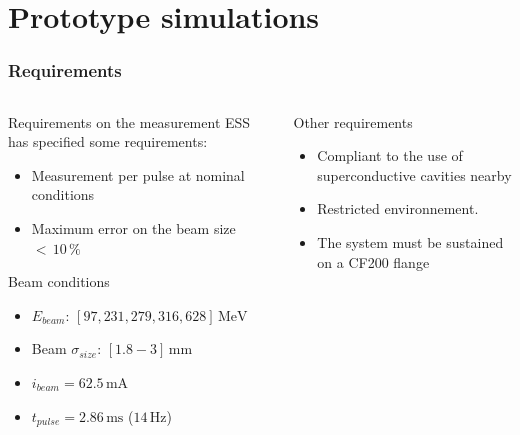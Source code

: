 \section{Prototype simulations}

\begin{frame}[t]
  \frametitle{Requirements}
  \begin{columns}[T]
    \begin{column}{0.45\textwidth}
      \begin{block}{Requirements on the measurement}
        ESS has specified some requirements:
        \begin{itemize}
          \item Measurement per pulse at nominal conditions
          \item Maximum error on the beam size $<\,10\,\%$
        \end{itemize}
      \end{block}
      \begin{block}{Beam conditions}
        \begin{itemize}
          \item $E_{beam}$: $[97,231,279,316,628]\,\mathrm{MeV}$
          \item Beam $\sigma_{size}$: $[1.8-3]\,\mathrm{mm}$
          \item $i_{beam}=62.5\,\mathrm{mA}$
          \item $t_{pulse}=2.86\,\mathrm{ms}$ ($14\,\mathrm{Hz}$)
        \end{itemize}
      \end{block}
    \end{column}
    \begin{column}{0.45\textwidth}
      \begin{block}{Other requirements}
        \begin{itemize}
          \item Compliant to the use of superconductive cavities nearby
          \item Restricted environnement.
          \item The system must be sustained on a CF200 flange
        \end{itemize}
      \end{block}

\end{column}
\end{columns}
\end{frame}
